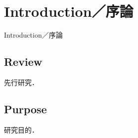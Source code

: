\chapter{Introduction／序論}
\label{chap_Introduction}

Introduction／序論

\section{Review}
先行研究．

\section{Purpose}
研究目的．

